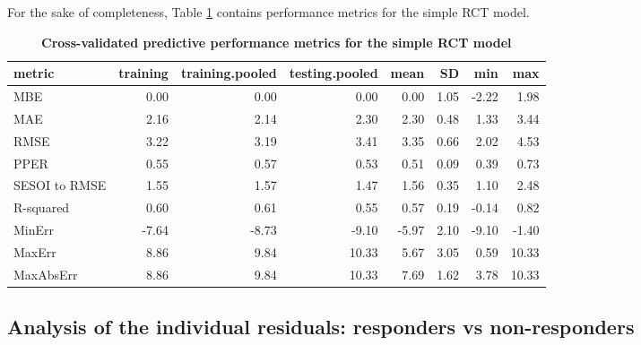 \documentclass[
]{book}
\begin{document}
For the sake of completeness, Table \ref{tab:simple-rct-model-perf-metrics} contains performance metrics for the simple RCT model.



\begin{table}

\caption{\label{tab:simple-rct-model-perf-metrics}\textbf{Cross-validated predictive performance metrics for the simple RCT model}}
\centering
\begin{tabular}[t]{lrrrrrrr}
\toprule
metric & training & training.pooled & testing.pooled & mean & SD & min & max\\
\midrule
MBE & 0.00 & 0.00 & 0.00 & 0.00 & 1.05 & -2.22 & 1.98\\
MAE & 2.16 & 2.14 & 2.30 & 2.30 & 0.48 & 1.33 & 3.44\\
RMSE & 3.22 & 3.19 & 3.41 & 3.35 & 0.66 & 2.02 & 4.53\\
PPER & 0.55 & 0.57 & 0.53 & 0.51 & 0.09 & 0.39 & 0.73\\
SESOI to RMSE & 1.55 & 1.57 & 1.47 & 1.56 & 0.35 & 1.10 & 2.48\\
\addlinespace
R-squared & 0.60 & 0.61 & 0.55 & 0.57 & 0.19 & -0.14 & 0.82\\
MinErr & -7.64 & -8.73 & -9.10 & -5.97 & 2.10 & -9.10 & -1.40\\
MaxErr & 8.86 & 9.84 & 10.33 & 5.67 & 3.05 & 0.59 & 10.33\\
MaxAbsErr & 8.86 & 9.84 & 10.33 & 7.69 & 1.62 & 3.78 & 10.33\\
\bottomrule
\end{tabular}
\end{table}

\hypertarget{analysis-of-the-individual-residuals-responders-vs-non-responders}{%
\subsection{Analysis of the individual residuals: responders vs non-responders}\label{analysis-of-the-individual-residuals-responders-vs-non-responders}}
\end{document}
